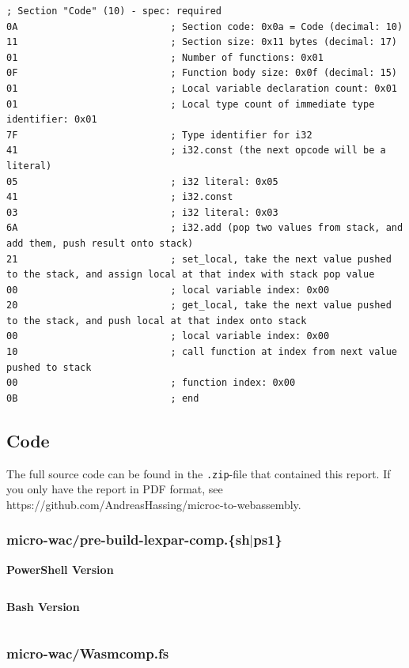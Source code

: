 \documentclass[a4paper]{article}
\begin{document}
\begin{verbatim}
; Section "Code" (10) - spec: required
0A                           ; Section code: 0x0a = Code (decimal: 10)
11                           ; Section size: 0x11 bytes (decimal: 17)
01                           ; Number of functions: 0x01
0F                           ; Function body size: 0x0f (decimal: 15)
01                           ; Local variable declaration count: 0x01
01                           ; Local type count of immediate type identifier: 0x01
7F                           ; Type identifier for i32
41                           ; i32.const (the next opcode will be a literal)
05                           ; i32 literal: 0x05
41                           ; i32.const
03                           ; i32 literal: 0x03
6A                           ; i32.add (pop two values from stack, and add them, push result onto stack)
21                           ; set_local, take the next value pushed to the stack, and assign local at that index with stack pop value
00                           ; local variable index: 0x00
20                           ; get_local, take the next value pushed to the stack, and push local at that index onto stack
00                           ; local variable index: 0x00
10                           ; call function at index from next value pushed to stack
00                           ; function index: 0x00
0B                           ; end
\end{verbatim}

\newpage
\subsection{Code}
\label{sec:appendix:code}
The full source code can be found in the \texttt{.zip}-file that contained this report. If you only have the report in PDF format, see https://github.com/AndreasHassing/microc-to-webassembly.

\subsubsection{micro-wac/pre-build-lexpar-comp.\{sh$|$ps1\}}
\label{sec:appendix:code:pre-build-lexpar-comp}
\textbf{PowerShell Version}
\inputminted[breaklines,tabsize=2,linenos]{powershell}{../micro-wac/pre-build-lexpar-comp.ps1}

\newpage
\noindent\textbf{Bash Version}
\inputminted[breaklines,tabsize=2,linenos]{bash}{../micro-wac/pre-build-lexpar-comp.sh}

\newpage
\subsubsection{micro-wac/Wasmcomp.fs}
\label{sec:appendix:code:Wasmcomp.fs}
\inputminted[breaklines,tabsize=2,linenos]{fsharp}{../micro-wac/Wasmcomp.fs}
\end{document}
